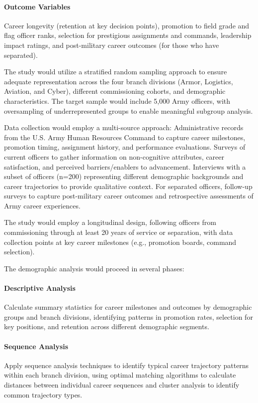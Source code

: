 \documentclass[../main.tex]{subfiles}
\begin{document}
\paragraph{Outcome Variables}
Career longevity (retention at key decision points), promotion to field grade and flag officer ranks, selection for prestigious assignments and commands, leadership impact ratings, and post-military career outcomes (for those who have separated).


The study would utilize a stratified random sampling approach to ensure adequate representation across the four branch divisions (Armor, Logistics, Aviation, and Cyber), different commissioning cohorts, and demographic characteristics. The target sample would include 5,000 Army officers, with oversampling of underrepresented groups to enable meaningful subgroup analysis.

Data collection would employ a multi-source approach: Administrative records from the U.S. Army Human Resources Command to capture career milestones, promotion timing, assignment history, and performance evaluations. Surveys of current officers to gather information on non-cognitive attributes, career satisfaction, and perceived barriers/enablers to advancement. Interviews with a subset of officers (n=200) representing different demographic backgrounds and career trajectories to provide qualitative context. For separated officers, follow-up surveys to capture post-military career outcomes and retrospective assessments of Army career experiences.

The study would employ a longitudinal design, following officers from commissioning through at least 20 years of service or separation, with data collection points at key career milestones (e.g., promotion boards, command selection).


The demographic analysis would proceed in several phases:

\paragraph{Descriptive Analysis}
Calculate summary statistics for career milestones and outcomes by demographic groups and branch divisions, identifying patterns in promotion rates, selection for key positions, and retention across different demographic segments.

\paragraph{Sequence Analysis}
Apply sequence analysis techniques to identify typical career trajectory patterns within each branch division, using optimal matching algorithms to calculate distances between individual career sequences and cluster analysis to identify common trajectory types.
\end{document}
